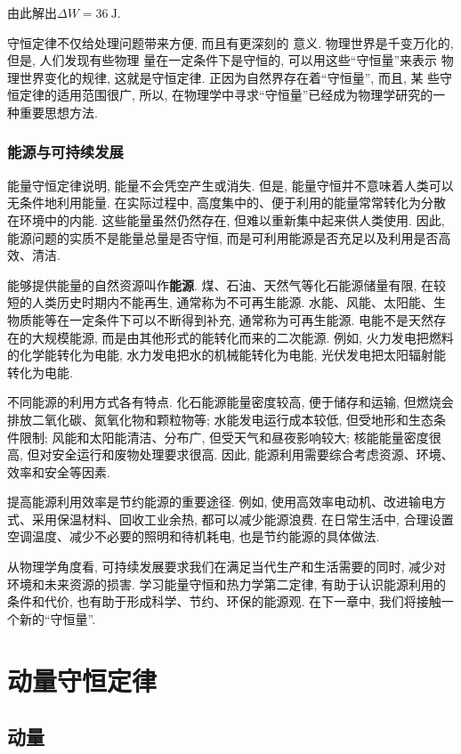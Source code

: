 \documentclass[11pt,a4paper]{ctexbook}
\begin{document}
由此解出$\Delta W = 36\ \mathrm{J}$.
\bigskip

守恒定律不仅给处理问题带来方便, 而且有更深刻的
意义. 物理世界是千变万化的, 但是, 人们发现有些物理
量在一定条件下是守恒的, 可以用这些``守恒量''来表示
物理世界变化的规律, 这就是守恒定律.
正因为自然界存在着``守恒量'', 而且, 某
些守恒定律的适用范围很广, 所以,
在物理学中寻求``守恒量''已经成为物理学研究的一种重要思想方法.


\subsection{能源与可持续发展}

能量守恒定律说明, 能量不会凭空产生或消失. 但是, 能量守恒并不意味着人类可以无条件地利用能量.
在实际过程中, 高度集中的、便于利用的能量常常转化为分散在环境中的内能. 这些能量虽然仍然存在,
但难以重新集中起来供人类使用. 因此, 能源问题的实质不是能量总量是否守恒, 而是可利用能源是否充足以及利用是否高效、清洁.

能够提供能量的自然资源叫作\textbf{能源}. 煤、石油、天然气等化石能源储量有限, 在较短的人类历史时期内不能再生,
通常称为不可再生能源. 水能、风能、太阳能、生物质能等在一定条件下可以不断得到补充, 通常称为可再生能源.
电能不是天然存在的大规模能源, 而是由其他形式的能转化而来的二次能源. 例如, 火力发电把燃料的化学能转化为电能,
水力发电把水的机械能转化为电能, 光伏发电把太阳辐射能转化为电能.

不同能源的利用方式各有特点. 化石能源能量密度较高, 便于储存和运输, 但燃烧会排放二氧化碳、氮氧化物和颗粒物等;
水能发电运行成本较低, 但受地形和生态条件限制; 风能和太阳能清洁、分布广, 但受天气和昼夜影响较大;
核能能量密度很高, 但对安全运行和废物处理要求很高. 因此, 能源利用需要综合考虑资源、环境、效率和安全等因素.

提高能源利用效率是节约能源的重要途径. 例如, 使用高效率电动机、改进输电方式、采用保温材料、回收工业余热,
都可以减少能源浪费. 在日常生活中, 合理设置空调温度、减少不必要的照明和待机耗电, 也是节约能源的具体做法.

从物理学角度看, 可持续发展要求我们在满足当代生产和生活需要的同时, 减少对环境和未来资源的损害.
学习能量守恒和热力学第二定律, 有助于认识能源利用的条件和代价, 也有助于形成科学、节约、环保的能源观.
在下一章中, 我们将接触一个新的``守恒量''.

\chapter{动量守恒定律}
\section{动量}
\label{第一节动量}
\end{document}
